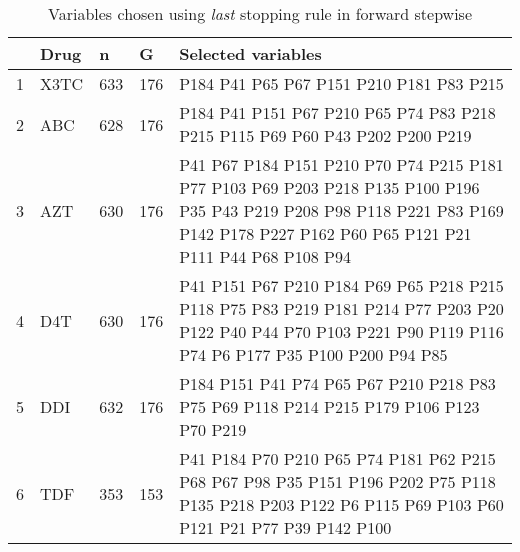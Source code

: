 \begin{table}[ht]
\centering
\begin{tabular}{rllll}
  \hline
 & Drug & n & G & Selected variables \\ 
  \hline
1 & X3TC & 633 & 176 & P184 P41 P65 P67 P151 P210 P181 P83 P215 \\ 
  2 & ABC & 628 & 176 & P184 P41 P151 P67 P210 P65 P74 P83 P218 P215 P115 P69 P60 P43 P202 P200 P219 \\ 
  3 & AZT & 630 & 176 & P41 P67 P184 P151 P210 P70 P74 P215 P181 P77 P103 P69 P203 P218 P135 P100 P196 P35 P43 P219 P208 P98 P118 P221 P83 P169 P142 P178 P227 P162 P60 P65 P121 P21 P111 P44 P68 P108 P94 \\ 
  4 & D4T & 630 & 176 & P41 P151 P67 P210 P184 P69 P65 P218 P215 P118 P75 P83 P219 P181 P214 P77 P203 P20 P122 P40 P44 P70 P103 P221 P90 P119 P116 P74 P6 P177 P35 P100 P200 P94 P85 \\ 
  5 & DDI & 632 & 176 & P184 P151 P41 P74 P65 P67 P210 P218 P83 P75 P69 P118 P214 P215 P179 P106 P123 P70 P219 \\ 
  6 & TDF & 353 & 153 & P41 P184 P70 P210 P65 P74 P181 P62 P215 P68 P67 P98 P35 P151 P196 P202 P75 P118 P135 P218 P203 P122 P6 P115 P69 P103 P60 P121 P21 P77 P39 P142 P100 \\ 
   \hline
\end{tabular}
\caption{Variables chosen using \textit{last} stopping rule in forward stepwise} 
\end{table}

